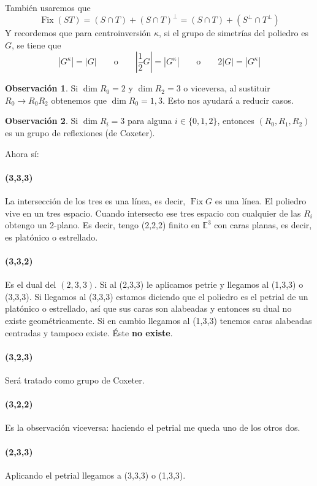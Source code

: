 \documentclass[spanish]{article}
\theoremstyle{definition}
\newtheorem*{obs}{Observación}
\newcommand{\E}{\mathbb{E}}
\DeclareMathOperator{\Fix}{Fix}
\begin{document}
También usaremos que
\[\Fix(ST)=(S\cap T)+(S\cap T)^\perp=(S\cap T)+(S^\perp\cap T^\perp)\]
Y recordemos que para centroinversión $\kappa$, si el grupo de simetrías del poliedro es $G$, se tiene que
\[|G^\kappa|=|G|\qquad\text{o}\qquad |\frac{1}{2}G|=|G^\kappa|\qquad\text{o}\qquad2|G|=|G^\kappa|\]
\begin{obs}
	Si $\dim R_0=2$ y $\dim R_2=3$ o viceversa, al sustituir $R_0\to R_0R_2$ obtenemos que $\dim R_0=1,3$. Esto nos ayudará a reducir casos.
\end{obs}
\begin{obs}
	Si $\dim R_i=3$ para alguna $i\in\{0,1,2\}$, entonces $(R_0,R_1,R_2)$ es un grupo de reflexiones (de Coxeter).
\end{obs}
Ahora sí:

\paragraph{\textbf{(3,3,3)}} La intersección de los tres es una línea, es decir, $\Fix G$ es una línea. El poliedro vive en un tres espacio. Cuando intersecto ese tres espacio con cualquier de las $R_i$ obtengo un 2-plano. Es decir, tengo (2,2,2) finito en $\E^3$ con caras planas, es decir, es platónico o estrellado.

\paragraph{\textbf{(3,3,2)}} Es el dual del $(2,3,3)$. Si al (2,3,3) le aplicamos petrie y llegamos al (1,3,3) o (3,3,3). Si llegamos al (3,3,3) estamos diciendo que el poliedro es el petrial de un platónico o estrellado, así que sus caras son alabeadas y entonces su dual no existe geométricamente. Si en cambio llegamos al (1,3,3) tenemos caras alabeadas centradas y tampoco existe. Éste \textbf{no existe}.

\paragraph{\textbf{(3,2,3)}}Será tratado como grupo de Coxeter.

\paragraph{\textbf{(3,2,2)}} Es la observación viceversa: haciendo el petrial me queda uno de los otros dos.

\paragraph{\textbf{(2,3,3)}} Aplicando el petrial llegamos a (3,3,3) o (1,3,3). 
\end{document}
